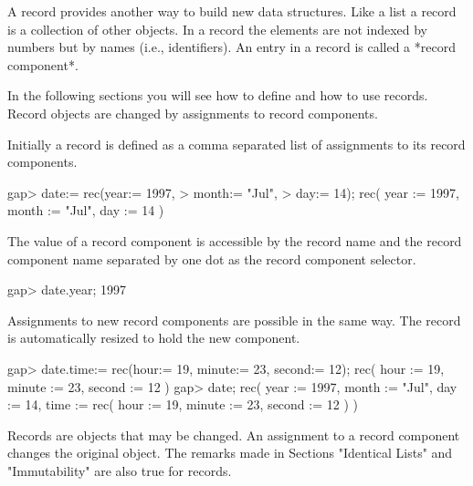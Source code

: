 


A record provides another way to  build new data structures.  Like a list
a record is a collection of other  objects.  In a record the elements are
not indexed by numbers but by  names (i.e., identifiers).   An entry in a
record is called a *record component*.

In  the following sections  you  will see how to  define  and how to  use
records.  Record objects are changed by assignments to record components.


Initially a record is defined as a comma separated list of assignments to
its record components.

\beginexample
    gap> date:= rec(year:= 1997,
    >               month:= "Jul",
    >               day:= 14);
    rec(
      year := 1997,
      month := "Jul",
      day := 14 )
\endexample

The value of a record component is accessible by  the record name and the
record  component name separated   by one dot   as  the record  component
selector.

\beginexample
    gap> date.year;
    1997
\endexample

Assignments to new record components  are possible in  the same way.  The
record is automatically resized to hold the new component.

\beginexample
    gap> date.time:= rec(hour:= 19, minute:= 23, second:= 12);
    rec(
      hour := 19,
      minute := 23,
      second := 12 )
    gap> date;
    rec(
      year := 1997,
      month := "Jul",
      day := 14,
      time := rec(
          hour := 19,
          minute := 23,
          second := 12 ) )
\endexample

Records are objects  that  may be  changed.   An assignment to  a  record
component  changes the original  object.    The remarks made in  Sections
"Identical Lists" and "Immutability" are also true for records.

